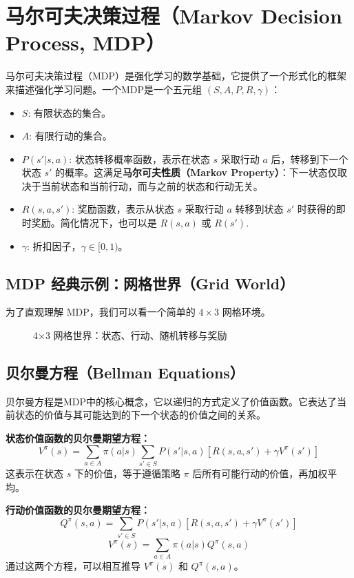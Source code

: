 \section{马尔可夫决策过程（Markov Decision Process, MDP）}
马尔可夫决策过程（MDP）是强化学习的数学基础，它提供了一个形式化的框架来描述强化学习问题。一个MDP是一个五元组 $(S, A, P, R, \gamma)$：
\begin{itemize}
    \item $S$: 有限状态的集合。
    \item $A$: 有限行动的集合。
    \item $P(s'|s, a)$: 状态转移概率函数，表示在状态 $s$ 采取行动 $a$ 后，转移到下一个状态 $s'$ 的概率。这满足\textbf{马尔可夫性质（Markov Property）}：下一状态仅取决于当前状态和当前行动，而与之前的状态和行动无关。
    \item $R(s, a, s')$: 奖励函数，表示从状态 $s$ 采取行动 $a$ 转移到状态 $s'$ 时获得的即时奖励。简化情况下，也可以是 $R(s, a)$ 或 $R(s')$.
    \item $\gamma$: 折扣因子，$\gamma \in [0, 1)$。
\end{itemize}

\subsection{MDP 经典示例：网格世界（Grid World）}
为了直观理解 MDP，我们可以看一个简单的 $4 \times 3$ 网格环境。
\begin{figure}[H]
  \centering
  \resizebox{0.95\textwidth}{!}{}
  \caption{4×3 网格世界：状态、行动、随机转移与奖励}
  \label{fig:ch10_orig4}
\end{figure}

\subsection{贝尔曼方程（Bellman Equations）}
贝尔曼方程是MDP中的核心概念，它以递归的方式定义了价值函数。它表达了当前状态的价值与其可能达到的下一个状态的价值之间的关系。

\textbf{状态价值函数的贝尔曼期望方程：}
$$ V^\pi(s) = \sum_{a \in A} \pi(a|s) \sum_{s' \in S} P(s'|s, a) [R(s, a, s') + \gamma V^\pi(s')] $$
这表示在状态 $s$ 下的价值，等于遵循策略 $\pi$ 后所有可能行动的价值，再加权平均。

\textbf{行动价值函数的贝尔曼期望方程：}
$$ Q^\pi(s, a) = \sum_{s' \in S} P(s'|s, a) [R(s, a, s') + \gamma V^\pi(s')] $$
$$ V^\pi(s) = \sum_{a \in A} \pi(a|s) Q^\pi(s, a) $$
通过这两个方程，可以相互推导 $V^\pi(s)$ 和 $Q^\pi(s, a)$。

